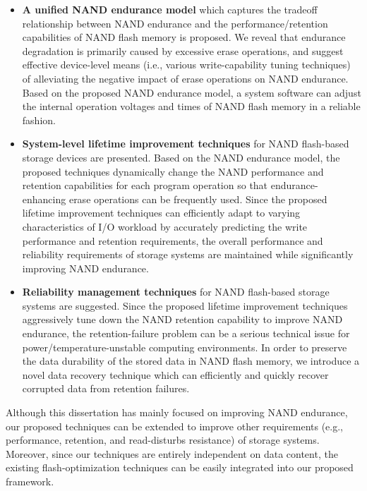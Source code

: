 \begin{itemize}
\item {\bfseries A unified NAND endurance model} which captures the tradeoff relationship between NAND endurance and the performance/retention capabilities of NAND flash memory is proposed.
We reveal that endurance degradation is primarily caused by excessive erase operations, and suggest effective device-level means (i.e., various write-capability tuning techniques) of alleviating the negative impact of erase operations on NAND endurance.
Based on the proposed NAND endurance model, a system software can adjust the internal operation voltages and times of NAND flash memory in a reliable fashion.
\item {\bfseries System-level lifetime improvement techniques} for NAND flash-based storage devices are presented.
Based on the NAND endurance model, the proposed techniques dynamically change the NAND performance and retention capabilities for each program operation so that endurance-enhancing erase operations can be frequently used.
Since the proposed lifetime improvement techniques can efficiently adapt to varying characteristics of I/O workload by accurately predicting the write performance and retention requirements, the overall performance and reliability requirements of storage systems are maintained while significantly improving NAND endurance.
\item {\bfseries Reliability management techniques} for NAND flash-based storage systems are suggested.
Since the proposed lifetime improvement techniques aggressively tune down the NAND retention capability to improve NAND endurance, the retention-failure problem can be a serious technical issue for power/temperature-unstable computing environments.
In order to preserve the data durability of the stored data in NAND flash memory, we introduce a novel data recovery technique which can efficiently and quickly recover corrupted data from retention failures.
\end{itemize}

Although this dissertation has mainly focused on improving NAND endurance, our proposed techniques can be extended to improve other requirements (e.g., performance, retention, and read-disturbs resistance) of storage systems.
Moreover, since our techniques are entirely independent on data content, the existing flash-optimization techniques can be easily integrated into our proposed framework.


